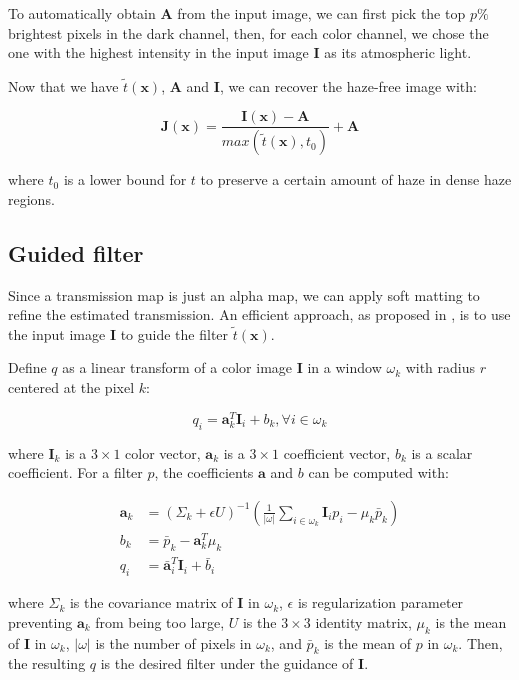 \documentclass{article}
\begin{document}
To automatically obtain $\mathbf{A}$ from the input image, we can first pick the top $p\%$ brightest pixels in the dark channel, then, for each color channel, we chose the one with the highest intensity in the input image $\mathbf{I}$ as its atmospheric light.

Now that we have $\tilde{t}(\mathbf{x})$, $\mathbf{A}$ and $\mathbf{I}$, we can recover the haze-free image with:

$$
\mathbf{J}(\mathbf{x}) = \frac{\mathbf{I}(\mathbf{x}) - \mathbf{A}}{max(\tilde{t}(\mathbf{x}),t_0)} + \mathbf{A}
$$

where $t_0$ is a lower bound for $t$ to preserve a certain amount of haze in dense haze regions.

\subsection{Guided filter}

Since a transmission map is just an alpha map, we can apply soft matting to refine the estimated transmission. An efficient approach, as proposed in \cite{he2010guided}, is to use the input image $\mathbf{I}$ to guide the filter $\tilde{t}(\mathbf{x})$.

Define $q$ as a linear transform of a color image $\mathbf{I}$ in a window $\omega_k$ with radius $r$ centered at the pixel $k$:

$$
q_i = \mathbf{a}_k^T\mathbf{I}_i + b_k, \forall i \in \omega_k
$$

where $\mathbf{I}_k$ is a $3 \times 1$ color vector, $\mathbf{a}_k$ is a $3 \times 1$ coefficient vector, $b_k$ is a scalar coefficient. For a filter $p$, the coefficients $\mathbf{a}$ and $b$ can be computed with:

\begin{align*}
\mathbf{a}_k &= (\Sigma_k + \epsilon U)^{-1}(\frac{1}{|\omega|}\sum_{i \in \omega_k}\mathbf{I}_i p_i - \mu_k \bar{p}_k) \\
b_k &= \bar{p}_k - \mathbf{a}_k^T\mu_k \\
q_i &= \bar{\mathbf{a}}_i^T\mathbf{I}_i + \bar{b}_i
\end{align*}

where $\Sigma_k$ is the covariance matrix of $\mathbf{I}$ in $\omega_k$, $\epsilon$ is regularization parameter preventing $\mathbf{a}_k$ from being too large, $U$ is the $3 \times 3$ identity matrix, $\mu_k$ is the mean of $\mathbf{I}$ in $\omega_k$, $|\omega|$ is the number of pixels in $\omega_k$, and $\bar{p}_k$ is the mean of $p$ in $\omega_k$. Then, the resulting $q$ is the desired filter under the guidance of $\mathbf{I}$.
\end{document}
